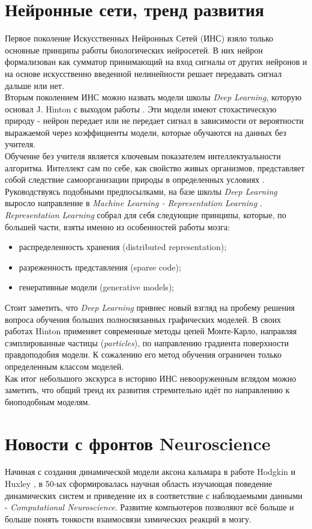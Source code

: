 \documentclass[a4paper,10pt]{article}
\begin{document}
\section{Нейронные сети, тренд развития}
Первое поколение Искусственных Нейронных Сетей (ИНС) взяло только основные принципы работы биологических нейросетей. В них нейрон формализован как сумматор принимающий на вход сигналы от других нейронов и на основе искусственно введенной нелинейности решает передавать сигнал дальше или нет.\\
\indent Вторым поколением ИНС можно назвать модели школы \textit{Deep Learning}, которую основал J. Hinton с выходом работы \cite{hinton2006}. Эти модели имеют стохастическую природу - нейрон передает или не передает сигнал в зависимости от вероятности выражаемой через коэффициенты модели, которые обучаются на данных без учителя.\\ 
\indent Обучение без учителя является ключевым показателем интеллектуальности алгоритма. Интеллект сам по себе, как свойство живых организмов, представляет собой следствие самоорганизации природы в определенных условиях \cite{evolut}. Руководствуясь подобными предпосылками, на базе школы \textit{Deep Learning} выросло направление в \textit{Machine Learning - Representation Learning} \cite{yoshua}.\\
\indent \textit{Representation Learning} собрал для себя следующие принципы, которые, по большей части, взяты именно из особенностей работы мозга:
\begin{itemize}
\item распределенность хранения (distributed representation);
\item разреженность представления (sparse code);
\item генеративные модели (generative models);
\end{itemize} 
\indent \indent Стоит заметить, что \textit{Deep Learning} привнес новый взгляд на пробему решения вопроса обучения больших полносвязанных графических моделей. В своих работах Hinton применяет современные методы цепей Монте-Карло, направляя сэмплированные частицы (\textit{particles}), по направлению градиента поверхности правдоподобия модели. К сожалению его метод обучения ограничен только определенным классом моделей.\\
\indent Как итог небольшого экскурса в историю ИНС невооруженным вглядом можно заметить, что общий тренд их развития стремительно идёт по направлению к биоподобным моделям.
\section{Новости с фронтов Neuroscience}
\label{sec:neuroscience}
Начиная с создания динамической модели аксона кальмара в работе Hodgkin и Huxley \cite{hodhux}, в 50-ых сформировалась научная область изучающая поведение динамических систем и приведение их в соответствие с наблюдаемыми данными - \textit{Computational Neuroscience}. Развитие компьютеров позволяют всё больше и больше понять тонкости взаимосвязи химических реакций в мозгу.\\ 
\end{document}
